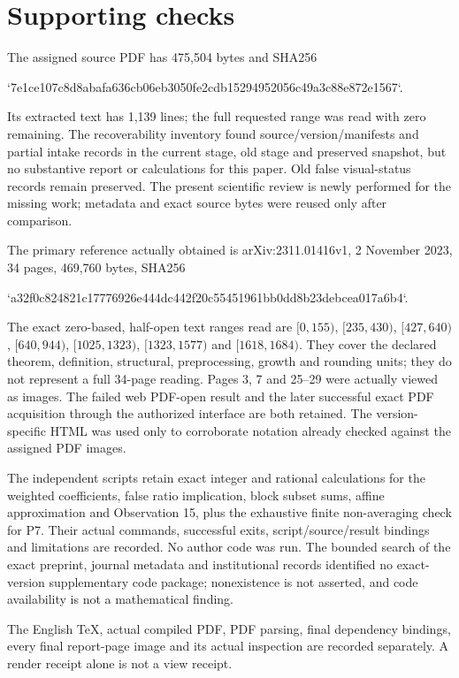 \documentclass[10pt]{article}
\begin{document}
\section*{Supporting checks}
The assigned source PDF has 475,504 bytes and SHA256\par
`7e1ce107c8d8abafa636cb06eb3050fe2cdb15294952056c49a3c88e872e1567`.\par
Its extracted text has 1,139 lines; the full requested range was read with zero remaining. The recoverability inventory found source/version/manifests and partial intake records in the current stage, old stage and preserved snapshot, but no substantive report or calculations for this paper. Old false visual-status records remain preserved. The present scientific review is newly performed for the missing work; metadata and exact source bytes were reused only after comparison.\par
The primary reference actually obtained is arXiv:2311.01416v1, 2 November 2023, 34 pages, 469,760 bytes, SHA256\par
`a32f0c824821c17776926e444dc442f20c55451961bb0dd8b23debcea017a6b4`.\par
The exact zero-based, half-open text ranges read are \([0,155)\), \([235,430)\), \([427,640)\), \([640,944)\), \([1025,1323)\), \([1323,1577)\) and \([1618,1684)\). They cover the declared theorem, definition, structural, preprocessing, growth and rounding units; they do not represent a full 34-page reading. Pages 3, 7 and 25–29 were actually viewed as images. The failed web PDF-open result and the later successful exact PDF acquisition through the authorized interface are both retained. The version-specific HTML was used only to corroborate notation already checked against the assigned PDF images.\par
The independent scripts retain exact integer and rational calculations for the weighted coefficients, false ratio implication, block subset sums, affine approximation and Observation 15, plus the exhaustive finite non-averaging check for P7. Their actual commands, successful exits, script/source/result bindings and limitations are recorded. No author code was run. The bounded search of the exact preprint, journal metadata and institutional records identified no exact-version supplementary code package; nonexistence is not asserted, and code availability is not a mathematical finding.\par
The English TeX, actual compiled PDF, PDF parsing, final dependency bindings, every final report-page image and its actual inspection are recorded separately. A render receipt alone is not a view receipt.\par
\end{document}
